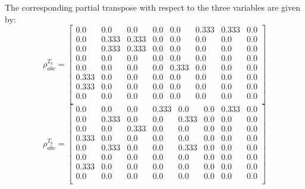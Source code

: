 \documentclass{scrartcl}
\begin{document}
    The corresponding partial transpose with respect to the three variables are given by:
    \begin{equation}
        \rho^{T_a}_{abc} =
        \left[
        \begin{array}{cccccccc}
        0.0 & 0.0 & 0.0 & 0.0 & 0.0 & 0.333 & 0.333 & 0.0 \\
        0.0 & 0.333 & 0.333 & 0.0 & 0.0 & 0.0 & 0.0 & 0.0 \\
        0.0 & 0.333 & 0.333 & 0.0 & 0.0 & 0.0 & 0.0 & 0.0 \\
        0.0 & 0.0 & 0.0 & 0.0 & 0.0 & 0.0 & 0.0 & 0.0 \\
        0.0 & 0.0 & 0.0 & 0.0 & 0.333 & 0.0 & 0.0 & 0.0 \\
        0.333 & 0.0 & 0.0 & 0.0 & 0.0 & 0.0 & 0.0 & 0.0 \\
        0.333 & 0.0 & 0.0 & 0.0 & 0.0 & 0.0 & 0.0 & 0.0 \\
        0.0 & 0.0 & 0.0 & 0.0 & 0.0 & 0.0 & 0.0 & 0.0 \\
        \end{array}
        \right]
        \end{equation}
        \begin{equation}
            \rho^{T_b}_{abc}=
            \left[
            \begin{array}{cccccccc}
            0.0 & 0.0 & 0.0 & 0.333 & 0.0 & 0.0 & 0.333 & 0.0 \\
            0.0 & 0.333 & 0.0 & 0.0 & 0.333 & 0.0 & 0.0 & 0.0 \\
            0.0 & 0.0 & 0.333 & 0.0 & 0.0 & 0.0 & 0.0 & 0.0 \\
            0.333 & 0.0 & 0.0 & 0.0 & 0.0 & 0.0 & 0.0 & 0.0 \\
            0.0 & 0.333 & 0.0 & 0.0 & 0.333 & 0.0 & 0.0 & 0.0 \\
            0.0 & 0.0 & 0.0 & 0.0 & 0.0 & 0.0 & 0.0 & 0.0 \\
            0.333 & 0.0 & 0.0 & 0.0 & 0.0 & 0.0 & 0.0 & 0.0 \\
            0.0 & 0.0 & 0.0 & 0.0 & 0.0 & 0.0 & 0.0 & 0.0 \\
            \end{array}
            \right]
            \end{equation}
\end{document}
